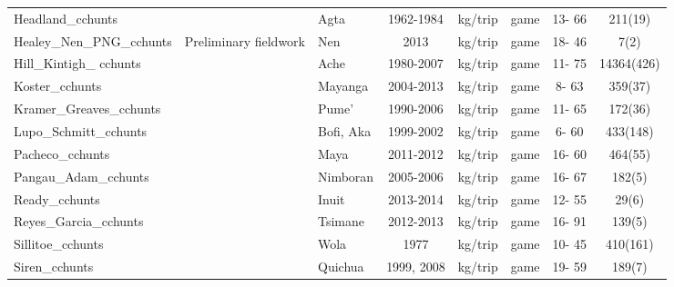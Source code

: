 \begin{landscape}
\begin{longtable}{M{2.6cm} M{3.6cm} M{1.5cm} c c M{1cm} c c}
Headland\_cchunts              & \cite{headland_why_1986}                  & Agta            & 1962-1984  & kg/trip   & game               & 13- 66  & 211(19)     \\
Healey\_Nen\_PNG\_cchunts        & Preliminary fieldwork                     & Nen             & 2013       & kg/trip   & game               & 18- 46  & 7(2)        \\
Hill\_Kintigh\_ cchunts          & \cite{hill_can_2009}                      & Ache            & 1980-2007  & kg/trip   & game               & 11- 75  & 14364(426)  \\
Koster\_cchunts                & \cite{koster_hunting_2008}                & Mayanga         & 2004-2013  & kg/trip   & game               & 8- 63   & 359(37)     \\
Kramer\_Greaves\_cchunts        & \cite{kramer_why_2017}                    & Pume'           & 1990-2006  & kg/trip   & game               & 11- 65  & 172(36)     \\
Lupo\_Schmitt\_cchunts          & \cite{lupo_upper_2002}                    & Bofi, Aka       & 1999-2002  & kg/trip   & game               & 6- 60   & 433(148)    \\
Pacheco\_cchunts               & \cite{pacheco-cobos_economic_2015}        & Maya            & 2011-2012  & kg/trip   & game               & 16- 60  & 464(55)     \\
Pangau\_Adam\_cchunts           & \cite{pangau-adam_wildmeat_2012}          & Nimboran        & 2005-2006  & kg/trip   & game               & 16- 67  & 182(5)      \\
Ready\_cchunts                 & \cite{ready_food_2016}                    & Inuit           & 2013-2014  & kg/trip   & game               & 12- 55  & 29(6)       \\
Reyes\_Garcia\_cchunts          & \cite{reyes-garcia_adaptive_2016}         & Tsimane         & 2012-2013  & kg/trip   & game               & 16- 91  & 139(5)      \\
Sillitoe\_cchunts              & \cite{sillitoe_managing_2004}             & Wola            & 1977       & kg/trip   & game               & 10- 45  & 410(161)    \\
Siren\_cchunts                 & \cite{siren_effects_2016}                 & Quichua         & 1999, 2008 & kg/trip   & game               & 19- 59  & 189(7)      \\

\end{longtable}
\end{landscape}
